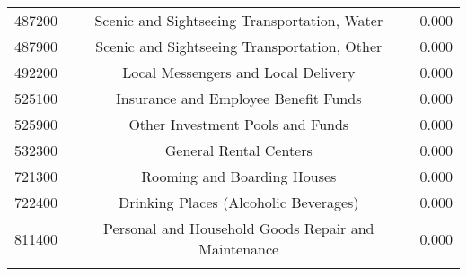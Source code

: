\begin{table}[!htbp]
\begin{tabular}{@{\extracolsep{5pt}} ccc}
487200 & Scenic and Sightseeing Transportation, Water & 0.000 \\ 
487900 & Scenic and Sightseeing Transportation, Other & 0.000 \\ 
492200 & Local Messengers and Local Delivery & 0.000 \\ 
525100 & Insurance and Employee Benefit Funds  & 0.000 \\ 
525900 & Other Investment Pools and Funds & 0.000 \\ 
532300 & General Rental Centers & 0.000 \\ 
721300 & Rooming and Boarding Houses & 0.000 \\ 
722400 & Drinking Places (Alcoholic Beverages) & 0.000 \\ 
811400 & Personal and Household Goods Repair and Maintenance & 0.000 \\ 
\hline \\[-1.8ex] 
\end{tabular} 
\end{table} 
